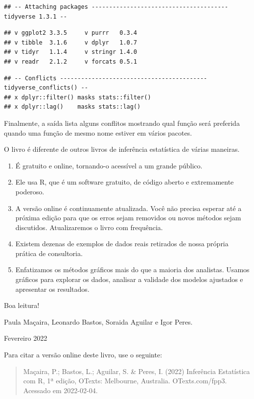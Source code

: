 \documentclass[
]{book}
\providecommand{\tightlist}{%
  \setlength{\itemsep}{0pt}\setlength{\parskip}{0pt}}
\begin{document}
\begin{verbatim}
## -- Attaching packages --------------------------------------- tidyverse 1.3.1 --
\end{verbatim}

\begin{verbatim}
## v ggplot2 3.3.5     v purrr   0.3.4
## v tibble  3.1.6     v dplyr   1.0.7
## v tidyr   1.1.4     v stringr 1.4.0
## v readr   2.1.2     v forcats 0.5.1
\end{verbatim}

\begin{verbatim}
## -- Conflicts ------------------------------------------ tidyverse_conflicts() --
## x dplyr::filter() masks stats::filter()
## x dplyr::lag()    masks stats::lag()
\end{verbatim}

Finalmente, a saída lista alguns conflitos mostrando qual função será preferida quando uma função de mesmo nome estiver em vários pacotes.

O livro é diferente de outros livros de inferência estatística de várias maneiras.

\begin{enumerate}
\def\labelenumi{\arabic{enumi}.}
\tightlist
\item
  É gratuito e online, tornando-o acessível a um grande público.
\item
  Ele usa R, que é um software gratuito, de código aberto e extremamente poderoso.
\item
  A versão online é continuamente atualizada. Você não precisa esperar até a próxima edição para que os erros sejam removidos ou novos métodos sejam discutidos. Atualizaremos o livro com frequência.
\item
  Existem dezenas de exemplos de dados reais retirados de nossa própria prática de consultoria.
\item
  Enfatizamos os métodos gráficos mais do que a maioria dos analistas. Usamos gráficos para explorar os dados, analisar a validade dos modelos ajustados e apresentar os resultados.
\end{enumerate}

Boa leitura!

Paula Maçaira, Leonardo Bastos, Soraida Aguilar e Igor Peres.

Fevereiro 2022

Para citar a versão online deste livro, use o seguinte:

\begin{quote}
Maçaira, P.; Bastos, L.; Aguilar, S. \& Peres, I. (2022) Inferência Estatística com R, 1ª edição, OTexts: Melbourne, Australia. OTexts.com/fpp3. Acessado em 2022-02-04.
\end{quote}
\end{document}
